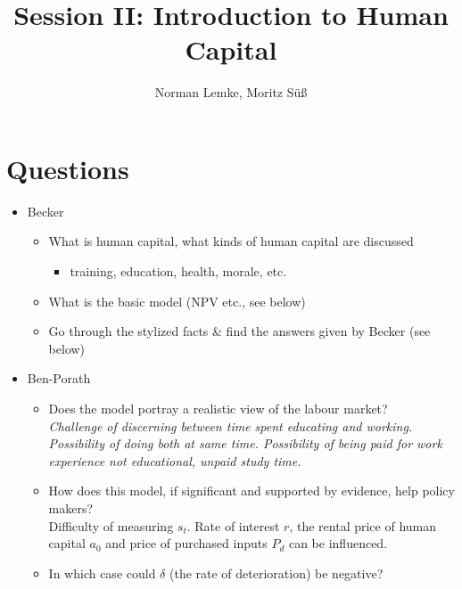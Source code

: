 \documentclass[12pt,a4paper]{article}
\author{Norman Lemke, Moritz Süß}
\begin{document}
  \title{Session II: Introduction to Human Capital}
  \maketitle
  \tableofcontents
  \thispagestyle{empty}
  \pagebreak
  \section{Questions} %
  \begin{itemize}
    \item Becker
      \begin{itemize}
        \item What is human capital, what kinds of human capital are discussed
          \begin{itemize}
            \item training, education, health, morale, etc.
          \end{itemize}
        \item What is the basic model (NPV etc., see below)
        \item Go through the stylized facts \& find the answers given by Becker (see below)
      \end{itemize}
    \item Ben-Porath
	  \begin{itemize}
	    \item Does the model portray a realistic view of the labour market? \\
	      \emph{Challenge of discerning between time spent educating and working. Possibility of doing both at same time. Possibility of being paid for work experience not educational, unpaid study time.}
	    \item How does this model, if significant and supported by evidence, help policy makers? \\
	      Difficulty of measuring $s_t$. Rate of interest $r$, the rental price of human capital $a_0$ and price of purchased inputs $P_d$ can be influenced.
	    \item In which case could $\delta$ (the rate of deterioration) be negative?
	  \end{itemize}
    

\end{itemize}
\end{document}
